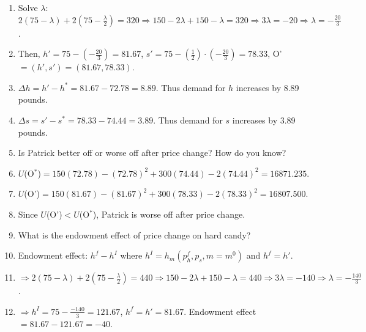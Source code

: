 \documentclass{article}
\begin{document}
\begin{enumerate}
\begin{enumerate}[label=(\alph*)]
 \item[] Solve $\lambda$: $2(75-\lambda)+2(75-\frac{\lambda}{2})=320\Rightarrow150-2\lambda+150-\lambda=320\Rightarrow 3\lambda=-20\Rightarrow\lambda=-\frac{20}{3}$.
 \item[] Then, $h'=75-(-\frac{20}{3})=81.67$, $s'=75-(\frac{1}{2})\cdot(-\frac{20}{3})=78.33$, O' $=(h',s')=(81.67,78.33)$.
 \item[] $\Delta h=h'-h^*=81.67-72.78=8.89$. Thus demand for $h$ increases by 8.89 pounds.
 \item[] $\Delta s=s'-s^*=78.33-74.44=3.89$. Thus demand for $s$ increases by 3.89 pounds.
 \item Is Patrick better off or worse off after price change? How do you know?
 \item[] $U$(O$^*$)$=150(72.78)-(72.78)^2+300(74.44)-2(74.44)^2=16871.235$.
 \item[] $U$(O')$=150(81.67)-(81.67)^2+300(78.33)-2(78.33)^2=16807.500$.
 \item[] Since $U$(O')\;$<$\;$U$(O$^*$), Patrick is worse off after price change.
\item What is the endowment effect of price change on hard candy?
\item[] Endowment effect: $h^f-h^I$ where $h^I=h_m(p_h^f,p_s,m=m^0)$ and $h^f=h'$.
\item[] $\Rightarrow 2(75-\lambda)+2(75-\frac{\lambda}{2})=440\Rightarrow 150-2\lambda+150-\lambda=440\Rightarrow 3\lambda=-140\Rightarrow\lambda=-\frac{140}{3}$.
\item[] $\Rightarrow h^I=75-\frac{-140}{3}=121.67$, $h^f=h'=81.67$. Endowment effect $=81.67-121.67=-40$.
\end{enumerate}
\end{enumerate}
\end{document}

